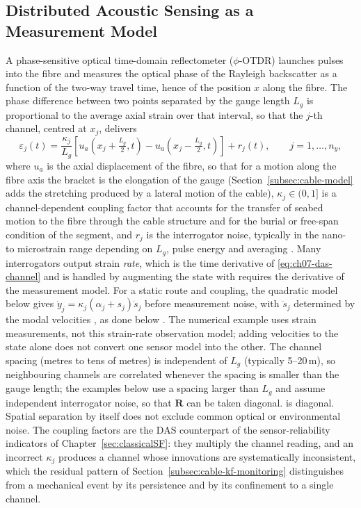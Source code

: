 \documentclass[graybox,envcountchap]{style/SNmono}
\providecommand{\DIFadd}[1]{{\protect\color{blue} #1}} %
\providecommand{\DIFdel}[1]{{\protect\color{red} #1}} %
\providecommand{\DIFaddbegin}{} %
\providecommand{\DIFaddend}{} %
\providecommand{\DIFdelbegin}{} %
\providecommand{\DIFdelend}{} %
\begin{document}
\subsection{Distributed Acoustic Sensing as a Measurement Model}
\label{subsec:das-measurement-model}
A phase-sensitive optical time-domain reflectometer ($\phi$-OTDR) launches pulses into the fibre and measures the optical phase of the Rayleigh backscatter as a function of the two-way travel time, hence of the position $x$ along the fibre. The phase difference between two points separated by the gauge length $L_g$ is proportional to the average axial strain over that interval, so that the $j$-th channel, centred at $x_j$, delivers
\begin{equation}
\varepsilon_j(t)=\frac{\kappa_j}{L_g}\left[u_a(x_j+\tfrac{L_g}{2},t)-u_a(x_j-\tfrac{L_g}{2},t)\right]+r_j(t),
\qquad j=1,\ldots,n_y,
\label{eq:ch07-das-channel}
\end{equation}
where $u_a$ is the axial displacement of the fibre, so that for a motion along the fibre axis the bracket is the elongation of the gauge (Section~\ref{subsec:cable-model} adds the stretching produced by a lateral motion of the cable), $\kappa_j\in(0,1]$ is a channel-dependent coupling factor that accounts for the transfer of seabed motion to the fibre through the cable structure and for the burial or free-span condition of the segment, and $r_j$ is the interrogator noise, typically in the nano- to microstrain range depending on $L_g$, pulse energy and averaging \cite{hartog_intro_2017,lindsey_fiberoptic_2021}. Many interrogators output strain \emph{rate}, which is the time derivative of \eqref{eq:ch07-das-channel} and \DIFdelbegin \DIFdel{is handled by augmenting the state with }\DIFdelend \DIFaddbegin \DIFadd{requires the derivative of the measurement model. For a static route and coupling, the quadratic model below gives $\dot y_j=\kappa_j(\alpha_j+s_j)\dot s_j$ before measurement noise, with $\dot s_j$ determined by }\DIFaddend the modal velocities\DIFdelbegin \DIFdel{, as done below}\DIFdelend \DIFaddbegin \DIFadd{. The numerical example uses strain measurements, not this strain-rate observation model; adding velocities to the state alone does not convert one sensor model into the other}\DIFaddend . The channel spacing (metres to tens of metres) is independent of $L_g$ (typically 5--20\,m), so neighbouring channels are correlated whenever the spacing is smaller than the gauge length; the examples below use a spacing larger than $L_g$ \DIFaddbegin \DIFadd{and assume independent interrogator noise, }\DIFaddend so that $\mathbf{R}$ \DIFdelbegin \DIFdel{can be taken diagonal. }\DIFdelend \DIFaddbegin \DIFadd{is diagonal. Spatial separation by itself does not exclude common optical or environmental noise. }\DIFaddend The coupling factors are the DAS counterpart of the sensor-reliability indicators of Chapter~\ref{sec:classicalSF}: they multiply the channel reading, and an incorrect $\kappa_j$ produces a channel whose innovations are systematically inconsistent, which the residual pattern of Section~\ref{subsec:cable-kf-monitoring} distinguishes from a mechanical event by its persistence and by its confinement to a single channel.
\end{document}
